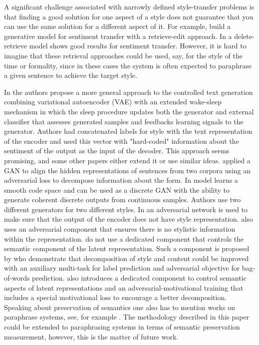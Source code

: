 \documentclass[11pt,a4paper]{article}
\begin{document}
A significant challenge associated with narrowly defined style-transfer problems is that finding a good solution for one aspect of a style does not guarantee that you can use the same solution for a different aspect of it. For example,  \citet{guu} build a generative model for sentiment transfer with a retrieve-edit approach. In \cite{li} a delete-retrieve model shows good results for sentiment transfer. However, it is hard to imagine that these retrieval approaches could be used, say, for the style of the time or formality, since in these cases the system is often expected to paraphrase a given sentence to achieve the target style. 

In \cite{hylsx} the authors propose a more general approach to the controlled text generation combining variational autoencoder (VAE) with an extended wake-sleep mechanism in which the sleep procedure updates both the generator and external classifier that assesses generated samples and feedbacks learning signals to the generator. Authors had concatenated labels for style with the text representation of the encoder and used this vector with "hard-coded" information about the sentiment of the output as the input of the decoder. This approach seems promising, and some other papers either extend it or use similar ideas. \citet{Shen} applied a GAN to align the hidden representations of sentences from two corpora using an adversarial loss to decompose information about the form. In \cite{zhao} model learns a smooth code space and can be used as a discrete GAN with the ability to generate coherent discrete outputs from continuous samples. Authors use two different generators for two different styles. In \cite{fu2} an adversarial network is used to make sure that the output of the encoder does not have style representation. \cite{hylsx} also uses an adversarial component that ensures there is no stylistic information within the representation. \citet{fu2} do not use a dedicated component that controls the semantic component of the latent representation.  Such a component is proposed by \citet{john18} who demonstrate that decomposition of style and content could be improved with an auxiliary multi-task for label prediction and adversarial objective for bag-of-words prediction. \citet{romanov18} also introduces a dedicated component to control semantic aspects of latent representations and an adversarial-motivational training that includes a special motivational loss to encourage a better decomposition. Speaking about preservation of semantics one also has to mention works on paraphrase systems, see, for example \cite{para1, para2, para3}. The methodology described in this paper could be extended to paraphrasing systems in terms of semantic preservation measurement, however, this is the matter of future work.
\end{document}
